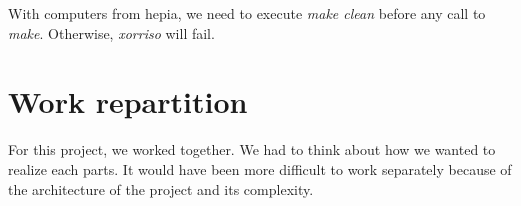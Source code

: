 \documentclass[a4paper]{article}
\begin{document}
With computers from hepia, we need to execute \textit{make clean} before any call to \textit{make}. 
Otherwise, \textit{xorriso} will fail.

\section{Work repartition}
For this project, we worked together. We had to think about how we wanted to realize each parts. It would have been more difficult to work separately because of the architecture of the project and its complexity.
\end{document}
